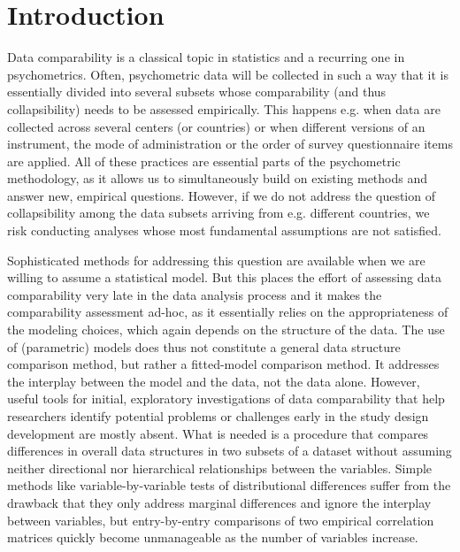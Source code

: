 \documentclass[a4paper,14pt]{article}
\begin{document}


\raggedright
\setlength{\parindent}{0.5cm}
\textwidth 5.25in
\textheight 8.75in

\date{}



\newcommand{\lorem}{{\bf LOREM}}
\newcommand{\ipsum}{{\bf IPSUM}}




\section*{Introduction}\label{sec:introduction}


Data comparability is a classical topic in statistics and a recurring one in psychometrics. Often, psychometric data will be collected in such a way that it is essentially divided into several subsets whose comparability (and thus collapsibility) needs to be assessed empirically. This happens e.g. when data are collected across several centers (or countries) or when different versions of an instrument, the mode of administration or the order of survey questionnaire items are applied. All of these practices are essential parts of the psychometric methodology, as it allows us to simultaneously build on existing methods and answer new, empirical questions. However, if we do not address the question of collapsibility among the data subsets arriving from e.g. different countries, we risk conducting analyses whose most fundamental assumptions are not satisfied.

Sophisticated methods for addressing this question are available when we are willing to assume a statistical model. But this places the effort of assessing data comparability very late in the data analysis process and it makes the comparability assessment ad-hoc, as it essentially relies on the appropriateness of the modeling choices, which again depends on the structure of the data. The use of (parametric) models does thus not constitute a %
general data structure comparison method, but rather a fitted-model comparison method. It addresses the interplay between the model and the data, not the data alone. However, useful tools for initial, exploratory investigations of data comparability that help researchers identify potential problems or challenges early in the study design development are mostly absent. What is needed is a procedure that compares differences in overall data structures in two subsets of a dataset without assuming neither directional nor hierarchical relationships between the variables. Simple methods like variable-by-variable tests of distributional differences suffer from the drawback that they only address marginal differences and ignore the interplay between variables, but entry-by-entry comparisons of two empirical correlation matrices quickly become unmanageable as the number of variables increase.
\end{document}
